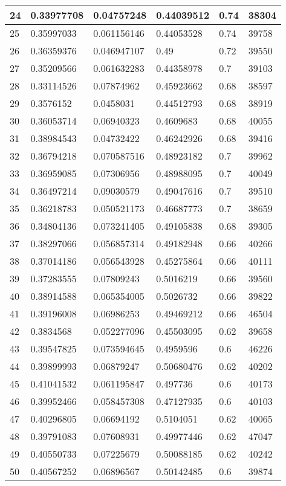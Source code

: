 \begin{longtable}{|l|l|l|l|l|l|}
24 & 0.33977708 & 0.04757248 & 0.44039512 & 0.74 & 38304 \\ \hline 
25 & 0.35997033 & 0.061156146 & 0.44053528 & 0.74 & 39758 \\ \hline 
26 & 0.36359376 & 0.046947107 & 0.49 & 0.72 & 39550 \\ \hline 
27 & 0.35209566 & 0.061632283 & 0.44358978 & 0.7 & 39103 \\ \hline 
28 & 0.33114526 & 0.07874962 & 0.45923662 & 0.68 & 38597 \\ \hline 
29 & 0.3576152 & 0.0458031 & 0.44512793 & 0.68 & 38919 \\ \hline 
30 & 0.36053714 & 0.06940323 & 0.4609683 & 0.68 & 40055 \\ \hline 
31 & 0.38984543 & 0.04732422 & 0.46242926 & 0.68 & 39416 \\ \hline 
32 & 0.36794218 & 0.070587516 & 0.48923182 & 0.7 & 39962 \\ \hline 
33 & 0.36959085 & 0.07306956 & 0.48988095 & 0.7 & 40049 \\ \hline 
34 & 0.36497214 & 0.09030579 & 0.49047616 & 0.7 & 39510 \\ \hline 
35 & 0.36218783 & 0.050521173 & 0.46687773 & 0.7 & 38659 \\ \hline 
36 & 0.34804136 & 0.073241405 & 0.49105838 & 0.68 & 39305 \\ \hline 
37 & 0.38297066 & 0.056857314 & 0.49182948 & 0.66 & 40266 \\ \hline 
38 & 0.37014186 & 0.056543928 & 0.45275864 & 0.66 & 40111 \\ \hline 
39 & 0.37283555 & 0.07809243 & 0.5016219 & 0.66 & 39560 \\ \hline 
40 & 0.38914588 & 0.065354005 & 0.5026732 & 0.66 & 39822 \\ \hline 
41 & 0.39196008 & 0.06986253 & 0.49469212 & 0.66 & 46504 \\ \hline 
42 & 0.3834568 & 0.052277096 & 0.45503095 & 0.62 & 39658 \\ \hline 
43 & 0.39547825 & 0.073594645 & 0.4959596 & 0.6 & 46226 \\ \hline 
44 & 0.39899993 & 0.06879247 & 0.50680476 & 0.62 & 40202 \\ \hline 
45 & 0.41041532 & 0.061195847 & 0.497736 & 0.6 & 40173 \\ \hline 
46 & 0.39952466 & 0.058457308 & 0.47127935 & 0.6 & 40103 \\ \hline 
47 & 0.40296805 & 0.06694192 & 0.5104051 & 0.62 & 40065 \\ \hline 
48 & 0.39791083 & 0.07608931 & 0.49977446 & 0.62 & 47047 \\ \hline 
49 & 0.40550733 & 0.07225679 & 0.50088185 & 0.62 & 40242 \\ \hline 
50 & 0.40567252 & 0.06896567 & 0.50142485 & 0.6 & 39874 \\ \hline 
\end{longtable}